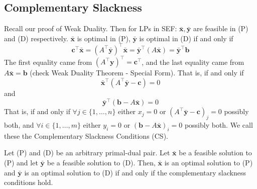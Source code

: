 \subsection{Complementary Slackness}
Recall our proof of Weak Duality. Then for LPs in SEF\@:
$ \bm{\bar{x}}, \bm{\bar{y}} $ are feasible in (P) and (D) respectively.
$ \bm{\bar{x}} $ is optimal in (P), $ \bm{\bar{y}} $ is optimal in
(D)  if and only if
\[ \bm{c} ^\top \bm{\bar{x}}=(A^\top \bm{\bar{y}})^\top \bm{\bar{x}}=\bm{\bar{y}}^\top(A \bm{\bar{x}})=
    \bm{\bar{y}}^\top \bm{b} \]
The first equality came from $ (A ^\top \bm{y})^\top=\bm{c}^\top $, and the
last equality came from $ A \bm{\bar{x}}=\bm{b} $ (check Weak Duality Theorem -
Special Form).
That is, if and only if
\[ \bm{\bar{x}}^\top(A ^\top \bm{\bar{y}}-\bm{c})=0 \]
and
\[ \bm{\bar{y}}^\top(\bm{b}-A \bm{\bar{x}})=0 \]
That is, if and only if $ \forall j\in \{1,\ldots,n\} $ either
$ x_j=0 $ or $ (A ^\top \bm{\bar{y}}-\bm{c})_j=0 $ possibly
both, and $ \forall i\in \{1,\ldots,m\} $ either $ y_i=0 $
or $ (\bm{b}-A \bm{\bar{x}})_i=0 $ possibly both. We call these
the Complementary Slackness Conditions (CS).

\begin{thmbox}
    \begin{theorem}
        Let (P) and (D) be an arbitrary primal-dual pair. Let
        $ \bm{\bar{x}} $ be a feasible solution to (P) and let
        $ \bm{\bar{y}} $ be a feasible solution to (D). Then,
        $ \bm{\bar{x}} $ is an optimal solution to (P) and
        $ \bm{\bar{y}} $ is an optimal solution to (D) if and only if
        the complementary slackness conditions hold.
    \end{theorem}
\end{thmbox}

